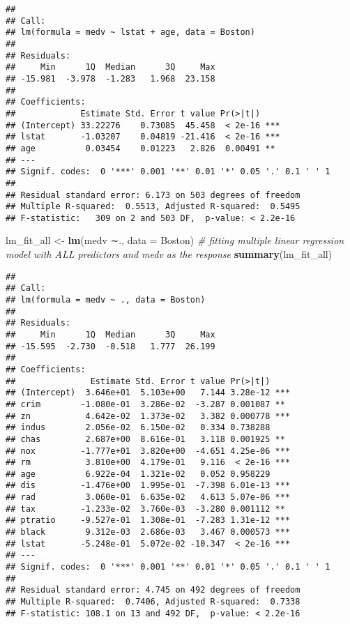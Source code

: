 \documentclass[]{article}
\newenvironment{Shaded}{\begin{snugshade}}{\end{snugshade}}
\newcommand{\CommentTok}[1]{\textcolor[rgb]{0.56,0.35,0.01}{\textit{#1}}}
\newcommand{\DataTypeTok}[1]{\textcolor[rgb]{0.13,0.29,0.53}{#1}}
\newcommand{\KeywordTok}[1]{\textcolor[rgb]{0.13,0.29,0.53}{\textbf{#1}}}
\newcommand{\NormalTok}[1]{#1}
\newcommand{\StringTok}[1]{\textcolor[rgb]{0.31,0.60,0.02}{#1}}
\begin{document}
\begin{verbatim}
## 
## Call:
## lm(formula = medv ~ lstat + age, data = Boston)
## 
## Residuals:
##     Min      1Q  Median      3Q     Max 
## -15.981  -3.978  -1.283   1.968  23.158 
## 
## Coefficients:
##             Estimate Std. Error t value Pr(>|t|)    
## (Intercept) 33.22276    0.73085  45.458  < 2e-16 ***
## lstat       -1.03207    0.04819 -21.416  < 2e-16 ***
## age          0.03454    0.01223   2.826  0.00491 ** 
## ---
## Signif. codes:  0 '***' 0.001 '**' 0.01 '*' 0.05 '.' 0.1 ' ' 1
## 
## Residual standard error: 6.173 on 503 degrees of freedom
## Multiple R-squared:  0.5513, Adjusted R-squared:  0.5495 
## F-statistic:   309 on 2 and 503 DF,  p-value: < 2.2e-16
\end{verbatim}

\begin{Shaded}
\begin{Highlighting}[]
\NormalTok{lm_fit_all <-}\StringTok{ }\KeywordTok{lm}\NormalTok{(medv ∼., }\DataTypeTok{data =}\NormalTok{ Boston) }\CommentTok{# fitting multiple linear regression model with ALL predictors and medv as the response}
\KeywordTok{summary}\NormalTok{(lm_fit_all)}
\end{Highlighting}
\end{Shaded}

\begin{verbatim}
## 
## Call:
## lm(formula = medv ~ ., data = Boston)
## 
## Residuals:
##     Min      1Q  Median      3Q     Max 
## -15.595  -2.730  -0.518   1.777  26.199 
## 
## Coefficients:
##               Estimate Std. Error t value Pr(>|t|)    
## (Intercept)  3.646e+01  5.103e+00   7.144 3.28e-12 ***
## crim        -1.080e-01  3.286e-02  -3.287 0.001087 ** 
## zn           4.642e-02  1.373e-02   3.382 0.000778 ***
## indus        2.056e-02  6.150e-02   0.334 0.738288    
## chas         2.687e+00  8.616e-01   3.118 0.001925 ** 
## nox         -1.777e+01  3.820e+00  -4.651 4.25e-06 ***
## rm           3.810e+00  4.179e-01   9.116  < 2e-16 ***
## age          6.922e-04  1.321e-02   0.052 0.958229    
## dis         -1.476e+00  1.995e-01  -7.398 6.01e-13 ***
## rad          3.060e-01  6.635e-02   4.613 5.07e-06 ***
## tax         -1.233e-02  3.760e-03  -3.280 0.001112 ** 
## ptratio     -9.527e-01  1.308e-01  -7.283 1.31e-12 ***
## black        9.312e-03  2.686e-03   3.467 0.000573 ***
## lstat       -5.248e-01  5.072e-02 -10.347  < 2e-16 ***
## ---
## Signif. codes:  0 '***' 0.001 '**' 0.01 '*' 0.05 '.' 0.1 ' ' 1
## 
## Residual standard error: 4.745 on 492 degrees of freedom
## Multiple R-squared:  0.7406, Adjusted R-squared:  0.7338 
## F-statistic: 108.1 on 13 and 492 DF,  p-value: < 2.2e-16
\end{verbatim}
\end{document}
